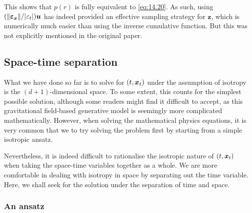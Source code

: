 This shows that $p(r)$ is fully equivalent to \cref{eq:14.20}. As such, using $(\|\bm{\varepsilon}_{\bm{x}}\|/|\varepsilon_{t}|)\bm{u}$ has indeed provided an effective sampling strategy for $\bm{z}$, which is numerically much easier than using the inverse cumulative function. But this was not explicitly mentioned in the original paper.

\subsection{Space-time separation}

What we have done so far is to solve for $(t,\bm{x}_{t})$ under the assumption of isotropy is the $(d+1)$-dimensional space. To some extent, this counts for the simplest possible solution, although some readers might find it difficult to accept, as this gravitational field-based generative model is seemingly more complicated mathematically. However, when solving the mathematical physics equations, it is very common that we  to try solving the problem first by starting from a simple isotropic ansatz.

Nevertheless, it is indeed difficult to rationalise the isotropic nature of $(t,\bm{x}_{t})$ when taking the space-time variables together as a whole. We are more comfortable in dealing with isotropy in space by separating out the time variable. Here, we shall seek for the solution under the separation of time and space.

\subsubsection{An ansatz}

